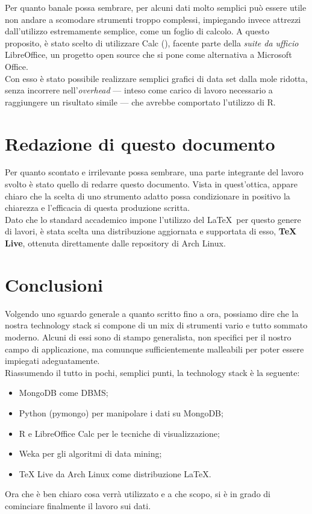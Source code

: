     Per quanto banale possa sembrare, per alcuni dati molto semplici può essere utile non andare a scomodare strumenti troppo complessi, impiegando invece attrezzi dall'utilizzo estremamente semplice, come un foglio di calcolo. A questo proposito, è stato scelto di utilizzare Calc (\cite{calc}), facente parte della \textit{suite da ufficio} LibreOffice, un progetto open source che si pone come alternativa a Microsoft Office. \\

    Con esso è stato possibile realizzare semplici grafici di data set dalla mole ridotta, senza incorrere nell'\textit{overhead} --- inteso come carico di lavoro necessario a raggiungere un risultato simile --- che avrebbe comportato l'utilizzo di R.

\section{Redazione di questo documento}

    Per quanto scontato e irrilevante possa sembrare, una parte integrante del lavoro svolto è stato quello di redarre questo documento. Vista in quest'ottica, appare chiaro che la scelta di uno strumento adatto possa condizionare in positivo la chiarezza e l'efficacia di questa produzione scritta. \\

    Dato che lo standard accademico impone l'utilizzo del \LaTeX\ per questo genere di lavori, è stata scelta una distribuzione aggiornata e supportata di esso, \textbf{TeX Live}, ottenuta direttamente dalle repository di Arch Linux.

\section{Conclusioni}

    Volgendo uno sguardo generale a quanto scritto fino a ora, possiamo dire che la nostra technology stack si compone di un mix di strumenti vario e tutto sommato moderno. Alcuni di essi sono di stampo generalista, non specifici per il nostro campo di applicazione, ma comunque sufficientemente malleabili per poter essere impiegati adeguatamente. \\

    Riassumendo il tutto in pochi, semplici punti, la technology stack è la seguente:

    \begin{itemize}
        \item MongoDB come DBMS;
        \item Python (pymongo) per manipolare i dati su MongoDB;
        \item R e LibreOffice Calc per le tecniche di visualizzazione;
        \item Weka per gli algoritmi di data mining;
        \item TeX Live da Arch Linux come distribuzione \LaTeX.
    \end{itemize}

    Ora che è ben chiaro cosa verrà utilizzato e a che scopo, si è in grado di cominciare finalmente il lavoro sui dati.

